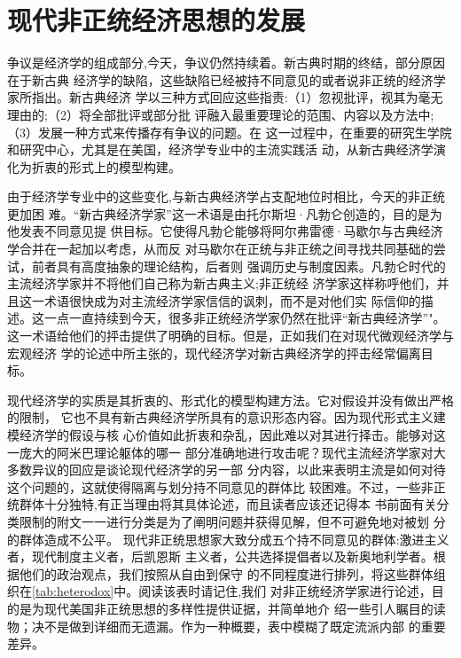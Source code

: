 \chapter{现代非正统经济思想的发展}

争议是经济学的组成部分,今天，争议仍然持续着。新古典时期的终结，部分原因在于新古典
经济学的缺陷，这些缺陷已经被持不同意见的或者说非正统的经济学家所指出。新古典经济
学以三种方式回应这些指责:（1）忽视批评，视其为毫无理由的;（2）将全部批评或部分批
评融入最重要理论的范围、内容以及方法中;（3）发展一种方式来传播存有争议的问题。在
这一过程中，在重要的研究生学院和研究中心，尤其是在美国，经济学专业中的主流实践活
动，从新古典经济学演化为折衷的形式上的模型构建。

由于经济学专业中的这些变化,与新古典经济学占支配地位时相比，今天的非正统更加困
难。“新古典经济学家”这一术语是由托尔斯坦·凡勃仑创造的，目的是为他发表不同意见提
供目标。它使得凡勃仑能够将阿尔弗雷德·马歇尔与古典经济学合并在一起加以考虑，从而反
对马歇尔在正统与非正统之间寻找共同基础的尝试，前者具有高度抽象的理论结构，后者则
强调历史与制度因素。凡勃仑时代的主流经济学家并不将他们自己称为新古典主义;非正统经
济学家这样称呼他们，并且这一术语很快成为对主流经济学家信信的讽刺，而不是对他们实
际信仰的描述。这一点一直持续到今天，很多非正统经济学家仍然在批评“新古典经济学”"。
这一术语给他们的抨击提供了明确的目标。但是，正如我们在对现代微观经济学与宏观经济
学的论述中所主张的，现代经济学对新古典经济学的抨击经常偏离目标。

现代经济学的实质是其折衷的、形式化的模型构建方法。它对假设并没有做出严格的限制，
它也不具有新古典经济学所具有的意识形态内容。因为现代形式主义建模经济学的假设与核
心价值如此折衷和杂乱，因此难以对其进行择击。能够对这一庞大的阿米巴理论躯体的哪一
部分准确地进行攻击呢？现代主流经济学家对大多数异议的回应是谈论现代经济学的另一部
分内容，以此来表明主流是如何对待这个问题的，这就使得隔离与划分持不同意见的群体比
较困难。不过，一些非正统群体十分独特,有正当理由将其具体论述，而且读者应该还记得本
书前面有关分类限制的附文一一进行分类是为了阐明问题并获得见解，但不可避免地对被划
分的群体造成不公平。
\enlargethispage{\baselineskip}
现代非正统思想家大致分成五个持不同意见的群体:激进主义者，现代制度主义者，后凯恩斯
主义者，公共选择提倡者以及新奥地利学者。根据他们的政治观点，我们按照从自由到保守
的不同程度进行排列，将这些群体组织在\cref{tab:heterodox}中。阅读该表时请记住,我们
对非正统经济学家进行论述，目的是为现代美国非正统思想的多样性提供证据，并简单地介
绍一些引人瞩目的读物；决不是做到详细而无遗漏。作为一种概要，表中模糊了既定流派内部
的重要差异。
\clearpage


